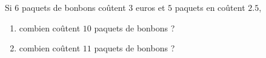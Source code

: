 
    \begin{mental}
        Si \( 6\) paquets de bonbons coûtent \( 3\) euros et \( 5\) paquets en coûtent \( 2.5\),
        \begin{enumerate}
            \item
                combien coûtent \( 10\) paquets de bonbons ?
            \item
                combien coûtent \( 11\) paquets de bonbons ?
        \end{enumerate}
    \end{mental}
